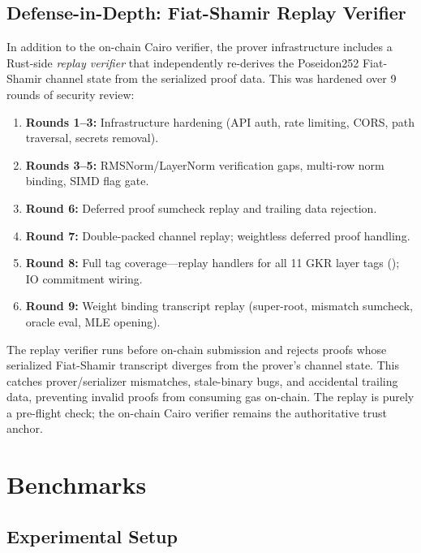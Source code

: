 \documentclass[10pt,twocolumn]{article}
\theoremstyle{definition}
\theoremstyle{remark}
\begin{document}
\subsection{Defense-in-Depth: Fiat-Shamir Replay Verifier}

In addition to the on-chain Cairo verifier, the prover infrastructure
includes a Rust-side \emph{replay verifier} that independently
re-derives the Poseidon252 Fiat-Shamir channel state from the
serialized proof data.
This was hardened over 9 rounds of security review:

\begin{enumerate}[nosep,leftmargin=1.4em]
  \item \textbf{Rounds 1--3:} Infrastructure hardening (API auth,
        rate limiting, CORS, path traversal, secrets removal).
  \item \textbf{Rounds 3--5:} RMSNorm/LayerNorm verification gaps,
        multi-row norm binding, SIMD flag gate.
  \item \textbf{Round 6:} Deferred proof sumcheck replay and
        trailing data rejection.
  \item \textbf{Round 7:} Double-packed channel replay;
        weightless deferred proof handling.
  \item \textbf{Round 8:} Full tag coverage---replay handlers for
        all 11 GKR layer tags (); IO commitment wiring.
  \item \textbf{Round 9:} Weight binding transcript replay
        (super-root, mismatch sumcheck, oracle eval, MLE opening).
\end{enumerate}

The replay verifier runs before on-chain submission and rejects
proofs whose serialized Fiat-Shamir transcript diverges from
the prover's channel state.
This catches prover/serializer mismatches, stale-binary bugs,
and accidental trailing data, preventing invalid proofs from
consuming gas on-chain.
The replay is purely a pre-flight check; the on-chain Cairo
verifier remains the authoritative trust anchor.


\section{Benchmarks}\label{sec:bench}

\subsection{Experimental Setup}
\end{document}
